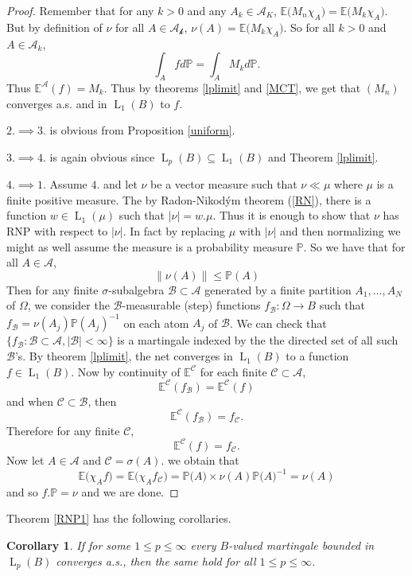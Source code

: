 \documentclass[]{report}
\newcommand{\lp}[2]{\operatorname{L}_{#1}({#2})}
\newcommand*{\Normu}[1]{\lVert {#1} \rVert}
\newcommand*{\ext}[1]{\mathbb{E}\big({#1}\big)}
\renewcommand{\P}[1]{\mathbb{P}\big({#1}\big)}
\newcommand*{\extop}[1]{\mathbb{E}^{{#1}}}
\newtheorem{corollary}{Corollary}[theorem]
\begin{document}
\begin{proof}
	Remember that for any $k>0$ and any $A_k\in \mathcal{A}_K$, $\ext{M_n\chi_A}=\ext{M_k\chi_A}$. But by definition of $\nu$ for all $A \in \mathcal{A_k}$, $\nu(A)=\ext{M_k\chi_A}$. So for all $k>0$ and $A\in \mathcal{A}_k$,
	\[ \int_Afd\mathbb{P}= \int_A M_kd\mathbb{P}. \]
	Thus $\extop{\mathcal{A}}(f)=M_k$. Thus by theorems \ref{lplimit} and \ref{MCT}, we get that $(M_n)$ converges a.s. and in $\lp{1}{B}$ to $f$. 
	
	$2.\implies3.$ is obvious from Proposition \ref{uniform}.
	
	$3.\implies 4.$ is again obvious since $\lp{p}{B}\subseteq \lp{1}{B}$ and Theorem \ref{lplimit}.
	
	$4. \implies 1.$ Assume $4.$ and let $\nu$ be a vector measure such that $\nu \ll \mu$ where $\mu$ is a finite positive measure. The by Radon-Nikod\'ym theorem (\ref{RN}), there is a function $w \in \lp{1}{\mu}$ such that $|\nu|=w.\mu$. Thus it is enough to show that $\nu$ has RNP with respect to $|\nu|$. In fact by replacing $\mu$ with $|\nu|$ and then normalizing we might as well assume the measure is a probability measure $\mathbb{P}$. So we have that for all $A\in \mathcal{A}$, \[ \Normu{\nu(A)}\leq \mathbb{P}(A) \]
	Then for any finite $\sigma$-subalgebra $\mathcal{B}\subset \mathcal{A}$ generated by a finite partition $A_1, \ldots, A_N$ of $\Omega$, we consider the $\mathcal{B}$-measurable (step) functions $f_{\mathcal{B}}:\Omega \rightarrow B$ such that $f_{\mathcal{B}}=\nu(A_j)\mathbb{P}(A_j)^{-1}$ on each atom $A_j$ of $\mathcal{B}$. We can check that $\{f_{\mathcal{B}}: \mathcal{B}\subset \mathcal{A}, |\mathcal{B}|<\infty\}$ is a martingale indexed by the the directed set of all such $\mathcal{B}$'s. By theorem \ref{lplimit}, the net converges in $\lp{1}{B}$ to a function $f \in \lp{1}{B}$. Now by continuity of $\extop{\mathcal{C}}$ for each finite $\mathcal{C}\subset \mathcal{A}$, \[ \extop{\mathcal{C}}(f_{\mathcal{B}})= \extop{\mathcal{C}}{(f)} \] 
	and when  $\mathcal{C}\subset \mathcal{B}$, then 
	\[ \extop{\mathcal{C}}(f_{\mathcal{B}})=f_{\mathcal{C}}. \]
	Therefore for any finite $\mathcal{C}$, \[ \extop{\mathcal{C}}(f)=f_{\mathcal{C}}. \]
	Now let $A\in \mathcal{A}$ and $\mathcal{C}=\sigma(A)$. we obtain that 
	\[ \ext{\chi_Af}=\ext{\chi_Af_{\mathcal{C}}}= \P{A}\times \nu(A)\P{A}^{-1}=\nu(A) \]
	and so $f.\mathbb{P}=\nu$ and we are done.
\end{proof}

Theorem \ref{RNP1} has the following corollaries.

\begin{corollary}
	If for some $1\leq p\leq \infty$ every $B$-valued martingale bounded in $\lp{p}{B}$ converges a.s., then the same hold for all $1\leq p \leq \infty$.
\end{corollary}
\end{document}
